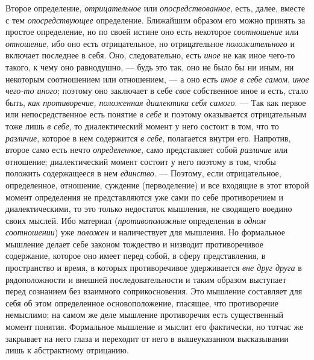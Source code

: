 \documentclass[twoside]{article}
\begin{document}
Второе определение,
{\em отрицательное} или
{\em опосредствованное},
есть, далее, вместе с тем
{\em опосредствующее}
определение. Ближайшим образом его можно принять за простое
определение, но по своей истине оно есть некоторое
{\em соотношение} или
{\em отношение}, ибо оно
есть отрицательное, но отрицательное
{\em положительного} и
включает последнее в себя. Оно, следовательно, есть
{\em иное} не как
иное чего-то такого, к чему оно равнодушно, — будь это
так, оно не было бы ни иным, ни некоторым соотношением или отношением, —
а оно есть {\em иное в
себе самом}, {\em иное чего-то иного}; поэтому оно заключает в себе
{\em свое} собственное
иное и есть, стало быть, {\em как
противоречие, положенная диалектика себя самого}. — Так как
первое или непосредственное есть понятие
{\em в себе} и поэтому
оказывается отрицательным тоже лишь
{\em в себе}, то
диалектический момент у него состоит в том, что то
{\em различие}, которое в
нем содержится {\em в себе},
полагается внутри его. Напротив, второе само есть нечто
{\em определенное}, само
представляет собой {\em различие}
или отношение; диалектический момент состоит у него поэтому в
том, чтобы положить содержащееся в нем
{\em единство}. —
Поэтому, если отрицательное, определенное, отношение,
суждение (перводеление) и все входящие в этот второй момент определения не
представляются уже сами по себе противоречием и диалектическими, то это
только недостаток мышления, не сводящего воедино своих мыслей. Ибо материал
({\em противоположные}
определения в {\em одном
соотношении}) уже
{\em положен} и
наличествует для мышления. Но формальное мышление делает
себе законом тождество и низводит противоречивое содержание,
которое оно имеет перед собой, в сферу представления, в пространство и
время, в которых противоречивое удерживается
{\em вне друг друга} в
рядоположности и внешней последовательности и таким образом выступает перед
сознанием без взаимного соприкосновения. Это мышление составляет для себя
об этом определенное основоположение, гласящее, что противоречие немыслимо;
на самом же деле мышление противоречия есть существенный момент понятия.
Формальное мышление и мыслит его фактически, но тотчас же закрывает на него
глаза и переходит от него в вышеуказанном высказывании лишь к абстрактному
отрицанию.
\end{document}
